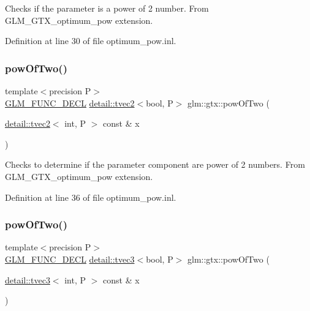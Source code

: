 Checks if the parameter is a power of 2 number. From G\+L\+M\+\_\+\+G\+T\+X\+\_\+optimum\+\_\+pow extension. 

Definition at line 30 of file optimum\+\_\+pow.\+inl.

\mbox{\label{group__gtx__optimum__pow_ga2dff80972edb8f4be69e40bb27ed0a9b}} 
\subsubsection{\texorpdfstring{pow\+Of\+Two()}{powOfTwo()}\hspace{0.1cm}{\footnotesize\ttfamily [2/4]}}
{\footnotesize\ttfamily template$<$precision P$>$ \\
\hyperlink{setup_8hpp_ab2d052de21a70539923e9bcbf6e83a51}{G\+L\+M\+\_\+\+F\+U\+N\+C\+\_\+\+D\+E\+CL} \hyperlink{structglm_1_1detail_1_1tvec2}{detail\+::tvec2}$<$bool, P$>$ glm\+::gtx\+::pow\+Of\+Two (\begin{DoxyParamCaption}\item[{\hyperlink{structglm_1_1detail_1_1tvec2}{detail\+::tvec2}$<$ int, P $>$ const \&}]{x }\end{DoxyParamCaption})}

Checks to determine if the parameter component are power of 2 numbers. From G\+L\+M\+\_\+\+G\+T\+X\+\_\+optimum\+\_\+pow extension. 

Definition at line 36 of file optimum\+\_\+pow.\+inl.

\mbox{\label{group__gtx__optimum__pow_ga103cbf6e3d63ab4c2bb5449e19b8639d}} 
\subsubsection{\texorpdfstring{pow\+Of\+Two()}{powOfTwo()}\hspace{0.1cm}{\footnotesize\ttfamily [3/4]}}
{\footnotesize\ttfamily template$<$precision P$>$ \\
\hyperlink{setup_8hpp_ab2d052de21a70539923e9bcbf6e83a51}{G\+L\+M\+\_\+\+F\+U\+N\+C\+\_\+\+D\+E\+CL} \hyperlink{structglm_1_1detail_1_1tvec3}{detail\+::tvec3}$<$bool, P$>$ glm\+::gtx\+::pow\+Of\+Two (\begin{DoxyParamCaption}\item[{\hyperlink{structglm_1_1detail_1_1tvec3}{detail\+::tvec3}$<$ int, P $>$ const \&}]{x }\end{DoxyParamCaption})}

